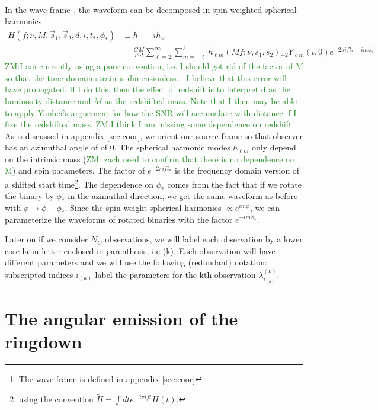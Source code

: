 \documentclass[aps,prd,amsmath,showpacs,amssymb,superscriptaddress,nofootinbib,longbibliography,eqsecnum,preprintnumbers]{revtex4-1}
\newcommand{\Ys}{{}_{-2}Y_{\ell m}}
\newcommand{\zach}[1]{\textcolor{ForestGreen}{#1}}
\begin{document}
In the wave frame\footnote{The wave frame is defined in appendix \ref{sec:coor}}, the waveform can be decomposed in spin weighted spherical harmonics
\begin{align}
\tilde H(f;\nu,M,\vec s_1,\vec s_2, d,\iota,t_*,\phi_*)
&\equiv \tilde h_+-i\tilde h_\times \nonumber \\
&=\frac{GM}{c^2d}\sum_{\ell =2}^\infty \sum_{m=-\ell}^\ell \tilde h_{\ell m}(Mf;\nu, s_1,s_2)\Ys(\iota, 0)e^{-2\pi i f t_* -im\phi_*} \label{eq:dec}
\end{align}
\zach{ZM:I am currently using a poor convention, i.e. I should get rid of the factor of M so that the time domain strain is dimensionless... I believe that this error will have propagated. If I do this, then the effect of redshift is to interpret d as the luminosity distance and $M$ as the redshifted mass. Note that I then may be able to apply Yanbei's arguement for how the SNR will accumalate with distance if I fixe the redshifted mass.}
\zach{ZM:I think I am missing some dependence on redshift}
As is discussed in appendix \ref{sec:coor}, we orient our source frame so that observer has an azimuthal angle of of $0$.
The spherical harmonic modes $h_{\ell m}$ only depend on the intrinsic mass (\zach{ZM: zach need to confirm that there is no dependence on M}) and spin parameters. The factor of $e^{-2\pi if t_*}$ is the frequency domain version of a shifted start time\footnote{using the convention $\tilde H= \int dt e^{-2\pi i ft}H(t)$.}. The dependence on $\phi_*$ comes from the fact that if we rotate the binary by $\phi_*$ in the azimuthal direction, we get the same waveform as before with $\phi \to \phi-\phi_*$. Since the spin-weight spherical harmonics $\propto e^{im \phi}$, we can parameterize the waveforms of rotated binaries with the factor $e^{-im\phi_*}$.

Later on if we consider $N_O$ observations, we will label each observation by a lower case latin letter enclosed in parenthesis, i.e (k). Each observation will have different parameters and we will use the following (redundant) notation: subscripted indices $i_{(k)}$ label the parameters for the kth observation $\lambda^{(k)}_{i_{(k)}}$.

\section{The angular emission of the ringdown}
\end{document}

